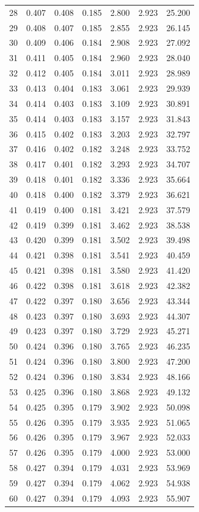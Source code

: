 \begin{table}
\begin{tabular}{rrrrrrr}
28 & 0.407 & 0.408 & 0.185 & 2.800 & 2.923 & 25.200 \\
29 & 0.408 & 0.407 & 0.185 & 2.855 & 2.923 & 26.145 \\
30 & 0.409 & 0.406 & 0.184 & 2.908 & 2.923 & 27.092 \\
31 & 0.411 & 0.405 & 0.184 & 2.960 & 2.923 & 28.040 \\
32 & 0.412 & 0.405 & 0.184 & 3.011 & 2.923 & 28.989 \\
33 & 0.413 & 0.404 & 0.183 & 3.061 & 2.923 & 29.939 \\
34 & 0.414 & 0.403 & 0.183 & 3.109 & 2.923 & 30.891 \\
35 & 0.414 & 0.403 & 0.183 & 3.157 & 2.923 & 31.843 \\
36 & 0.415 & 0.402 & 0.183 & 3.203 & 2.923 & 32.797 \\
37 & 0.416 & 0.402 & 0.182 & 3.248 & 2.923 & 33.752 \\
38 & 0.417 & 0.401 & 0.182 & 3.293 & 2.923 & 34.707 \\
39 & 0.418 & 0.401 & 0.182 & 3.336 & 2.923 & 35.664 \\
40 & 0.418 & 0.400 & 0.182 & 3.379 & 2.923 & 36.621 \\
41 & 0.419 & 0.400 & 0.181 & 3.421 & 2.923 & 37.579 \\
42 & 0.419 & 0.399 & 0.181 & 3.462 & 2.923 & 38.538 \\
43 & 0.420 & 0.399 & 0.181 & 3.502 & 2.923 & 39.498 \\
44 & 0.421 & 0.398 & 0.181 & 3.541 & 2.923 & 40.459 \\
45 & 0.421 & 0.398 & 0.181 & 3.580 & 2.923 & 41.420 \\
46 & 0.422 & 0.398 & 0.181 & 3.618 & 2.923 & 42.382 \\
47 & 0.422 & 0.397 & 0.180 & 3.656 & 2.923 & 43.344 \\
48 & 0.423 & 0.397 & 0.180 & 3.693 & 2.923 & 44.307 \\
49 & 0.423 & 0.397 & 0.180 & 3.729 & 2.923 & 45.271 \\
50 & 0.424 & 0.396 & 0.180 & 3.765 & 2.923 & 46.235 \\
51 & 0.424 & 0.396 & 0.180 & 3.800 & 2.923 & 47.200 \\
52 & 0.424 & 0.396 & 0.180 & 3.834 & 2.923 & 48.166 \\
53 & 0.425 & 0.396 & 0.180 & 3.868 & 2.923 & 49.132 \\
54 & 0.425 & 0.395 & 0.179 & 3.902 & 2.923 & 50.098 \\
55 & 0.426 & 0.395 & 0.179 & 3.935 & 2.923 & 51.065 \\
56 & 0.426 & 0.395 & 0.179 & 3.967 & 2.923 & 52.033 \\
57 & 0.426 & 0.395 & 0.179 & 4.000 & 2.923 & 53.000 \\
58 & 0.427 & 0.394 & 0.179 & 4.031 & 2.923 & 53.969 \\
59 & 0.427 & 0.394 & 0.179 & 4.062 & 2.923 & 54.938 \\
60 & 0.427 & 0.394 & 0.179 & 4.093 & 2.923 & 55.907 \\
\bottomrule
\end{tabular}
\end{table}
